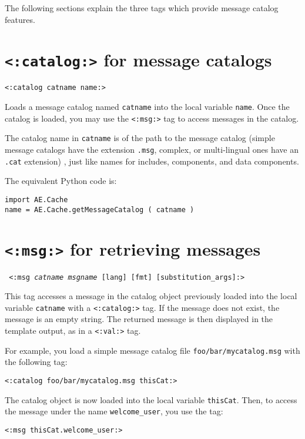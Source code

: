 \documentclass{manual}
\begin{document}
The following sections explain the three tags which
provide message catalog features.


\section{\texttt{<:catalog:>} for message catalogs}
\label{tagcatalog}

\texttt{<:catalog catname name:>}

Loads a  message catalog 
named \texttt{catname} into the local variable 
\texttt{name}. Once the catalog is loaded, you may
use the \texttt{<:msg:>} 
tag to access messages in the catalog.

The catalog name in \texttt{catname} is of the path to the message
catalog (simple message catalogs have the extension \texttt{.msg}, complex, or multi-lingual ones have an \texttt{.cat} extension)
, just like names for includes,
components, and data components.

The equivalent Python code is:
\begin{verbatim}
import AE.Cache
name = AE.Cache.getMessageCatalog ( catname )
\end{verbatim}


\section{\texttt{<:msg:>} for retrieving messages}
\label{tagmsg}

\texttt{
<:msg \emph{catname msgname} [lang] 
    [fmt] [substitution_args]:>
}

This tag accesses a message in the catalog object
previously loaded into the local variable \texttt{catname}
with a \texttt{<:catalog:>}
tag. If the message does not
exist, the message is an empty string. The returned message
is then displayed in the template output, as in a
\texttt{<:val:>}  tag.

For example, you load a simple message catalog file
\texttt{foo/bar/mycatalog.msg} with the following tag:

\begin{verbatim}
<:catalog foo/bar/mycatalog.msg thisCat:>
\end{verbatim}

The catalog object is now loaded into the local variable
\texttt{thisCat}. Then, to access the message under the name
\texttt{welcome_user}, you use the tag:

\begin{verbatim}
<:msg thisCat.welcome_user:>
\end{verbatim}
\end{document}

